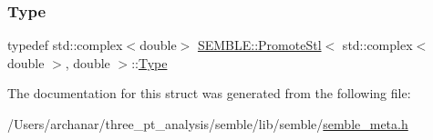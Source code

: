 \mbox{\label{structSEMBLE_1_1PromoteStl_3_01std_1_1complex_3_01double_01_4_00_01double_01_4_acc3f8409c7950ecf0d488033807df399}} 
\subsubsection{\texorpdfstring{Type}{Type}\hspace{0.1cm}{\footnotesize\ttfamily [2/2]}}
{\footnotesize\ttfamily typedef std\+::complex$<$double$>$ \mbox{\hyperlink{structSEMBLE_1_1PromoteStl}{S\+E\+M\+B\+L\+E\+::\+Promote\+Stl}}$<$ std\+::complex$<$ double $>$, double $>$\+::\mbox{\hyperlink{structSEMBLE_1_1PromoteStl_3_01std_1_1complex_3_01double_01_4_00_01double_01_4_acc3f8409c7950ecf0d488033807df399}{Type}}}



The documentation for this struct was generated from the following file\+:\begin{DoxyCompactItemize}
\item 
/\+Users/archanar/three\+\_\+pt\+\_\+analysis/semble/lib/semble/\mbox{\hyperlink{lib_2semble_2semble__meta_8h}{semble\+\_\+meta.\+h}}\end{DoxyCompactItemize}
